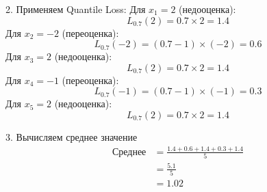 2. Применяем Quantile Loss:
Для $x_1 = 2$ (недооценка):
\[
    L_{0.7}(2) = 0.7 \times 2 = 1.4
\]
Для $x_2 = -2$ (переоценка):
\[
    L_{0.7}(-2) = (0.7 - 1) \times (-2) = 0.6
\]
Для $x_3 = 2$ (недооценка):
\[
    L_{0.7}(2) = 0.7 \times 2 = 1.4
\]
Для $x_4 = -1$ (переоценка):
\[
    L_{0.7}(-1) = (0.7 - 1) \times (-1) = 0.3
\]
Для $x_5 = 2$ (недооценка):
\[
    L_{0.7}(2) = 0.7 \times 2 = 1.4
\]

3. Вычисляем среднее значение
\[
    \begin{aligned}
        \text{Среднее} & = \frac{1.4 + 0.6 + 1.4 + 0.3 + 1.4}{5} \\
                       & = \frac{5.1}{5}                         \\
                       & = 1.02
    \end{aligned}
\]

